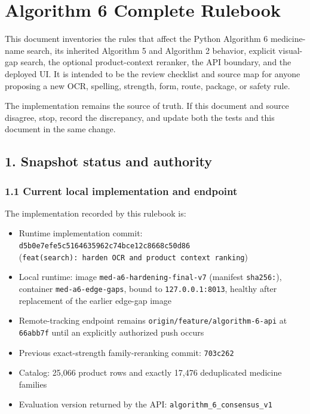 \chapter{Algorithm 6 Complete Rulebook}\label{algorithm-6-complete-rulebook}

This document inventories the rules that affect the Python Algorithm 6 medicine-name search, its inherited Algorithm 5 and Algorithm 2 behavior, explicit visual-gap search, the optional product-context reranker, the API boundary, and the deployed UI. It is intended to be the review checklist and source map for anyone proposing a new OCR, spelling, strength, form, route, package, or safety rule.

The implementation remains the source of truth. If this document and source disagree, stop, record the discrepancy, and update both the tests and this document in the same change.

\section{1. Snapshot status and authority}\label{1-snapshot-status-and-authority}

\subsection{1.1 Current local implementation and endpoint}\label{11-current-local-implementation-and-endpoint}

The implementation recorded by this rulebook is:

\begin{itemize}
\tightlist
\item
  Runtime implementation commit: \texttt{d5b0e7efe5c5164635962c74bce12c8668c50d86} (\texttt{feat(search):\ harden\ OCR\ and\ product\ context\ ranking})
\item
  Local runtime: image \texttt{med-a6-hardening-final-v7} (manifest \texttt{sha256:}), container \texttt{med-a6-edge-gaps}, bound to \texttt{127.0.0.1:8013}, healthy after replacement of the earlier edge-gap image
\item
  Remote-tracking endpoint remains \texttt{origin/feature/algorithm-6-api} at \texttt{66abb7f} until an explicitly authorized push occurs
\item
  Previous exact-strength family-reranking commit: \texttt{703c262}
\item
  Catalog: 25,066 product rows and exactly 17,476 deduplicated medicine families
\item
  Evaluation version returned by the API: \texttt{algorithm\_\allowbreak{}6\_\allowbreak{}consensus\_\allowbreak{}v1}
\end{itemize}

